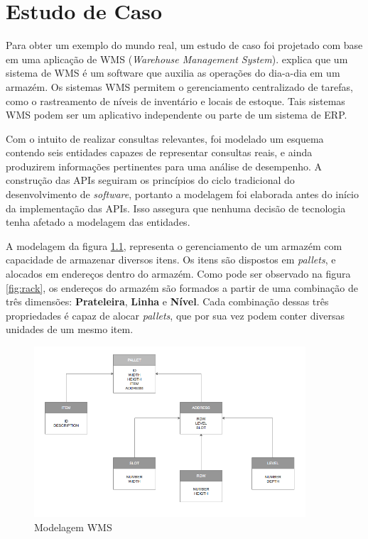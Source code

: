 \chapter[Estudo de Caso]{Estudo de Caso}\label{cap:estudo}

Para obter um exemplo do mundo real, um estudo de caso foi projetado com base em uma aplicação de WMS (\textit{Warehouse Management System}).  explica que um sistema de WMS é um software que auxilia as operações do dia-a-dia em um armazém. Os sistemas WMS permitem o gerenciamento centralizado de tarefas, como o rastreamento de níveis de inventário e locais de estoque. Tais sistemas WMS podem ser um aplicativo independente ou parte de um sistema de ERP.

Com o intuito de realizar consultas relevantes, foi modelado um esquema contendo seis entidades capazes de representar consultas reais, e ainda produzirem informações pertinentes para uma análise de desempenho. A construção das APIs seguiram os princípios do ciclo tradicional do desenvolvimento de \textit{software}, portanto a modelagem foi elaborada antes do início da implementação das APIs. Isso assegura que nenhuma decisão de tecnologia tenha afetado a modelagem das entidades.

A modelagem da figura \ref{fig:modelagem}, representa o gerenciamento de um armazém com capacidade de armazenar diversos itens. Os itens são dispostos em \textit{pallets}, e alocados em endereços dentro do armazém. Como pode ser observado na figura \ref{fig:rack}, os endereços do armazém são formados a partir de uma combinação de três dimensões: \textbf{Prateleira}, \textbf{Linha} e \textbf{Nível}. Cada combinação dessas três propriedades é capaz de alocar \textit{pallets}, que por sua vez podem conter diversas unidades de um mesmo item.

\begin{figure}[htbp]
\centering
\includegraphics[width=0.9\textwidth]{figuras/model.png}
\caption{Modelagem WMS}
\label{fig:modelagem}
\end{figure}

